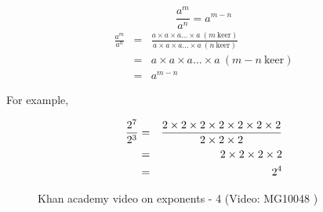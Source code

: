 {
$$ \frac{ {a}^{m} }{ {a}^{n} }={a}^{m-n}$$
\begin{eqnarray*}
\frac{a^m}{a^n} &=& \frac{a \times a \times a \ldots \times a ~ (m~\mbox{keer})} {a \times a \times a \ldots \times a ~ (n~\mbox{keer})} \\
&= & a \times a \times a \ldots \times a ~ (m-n~\mbox{keer}) \\
&= & a^{m-n}
\end{eqnarray*}

}




          
\label{m38359*id65293}For example,

\begin{eqnarray*}
    \dfrac{{2}^{7}}{{2}^{3}}& =& \dfrac{2\ensuremath{\times}2\ensuremath{\times}2\ensuremath{\times}2\ensuremath{\times}2\ensuremath{\times}2\ensuremath{\times}2}{2\ensuremath{\times}2\ensuremath{\times}2}\hfill \\
						     & =& 2\ensuremath{\times}2\ensuremath{\times}2\ensuremath{\times}2\hfill \\
						     & =& {2}^{4}\hfill \hfill 
\end{eqnarray*}

\setcounter{subfigure}{0}
\begin{figure}[H] %
\textnormal{Khan academy video on exponents - 4}\vspace{.1in} \nopagebreak
\label{m38359*yt-media6}\label{m38359*yt-video6}
 { (Video:  MG10048 )}
\end{figure}       


